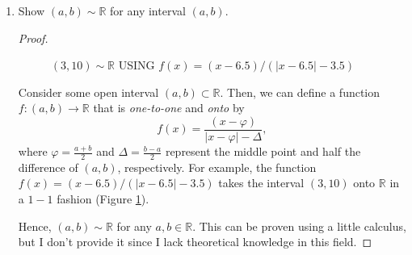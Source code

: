 \documentclass[12pt]{article}
\newcommand{\R}{\mathbb{R}}
\newenvironment{problem}[2][Problem]{\begin{trivlist}
		\item[\hskip \labelsep {\bfseries #1}\hskip \labelsep {\bfseries #2.}]}{\end{trivlist}}
\begin{document}
\begin{problem}{1.5.4}
	\begin{enumerate}[label=(\alph*)]
		\item Show $(a,b) \sim \R$ for any interval $(a,b)$.
		\begin{proof}

		  \begin{figure}
                \centering
                \label{fig:open}
                \caption{$(3,10)\sim \R$ USING $f(x)=(x-6.5)/(\vert x-6.5\vert - 3.5)$}
                \end{figure}

			Consider some open interval $(a,b)\subset \R$. Then, we can define a function $f:(a,b)\to \R$ that is \textit{one-to-one} and \textit{onto} by 
			\begin{equation*}
				f(x) = \frac{(x-\varphi)}{\vert x-\varphi\vert - \Delta},
			\end{equation*}
		where $\varphi = \frac{a+b}{2}$ and $\Delta = \frac{b-a}{2}$ represent the middle point and half the difference of $(a,b)$, respectively. For example, the function $f(x)=(x-6.5)/(\vert x-6.5\vert - 3.5)$ takes the interval $(3,10)$ onto $\R$ in a $1-1$ fashion (Figure \ref{fig:open}).
		

		Hence, $(a,b)\sim \R$ for any $a,b\in \R$. This can be proven using a little calculus, but I don't provide it since I lack theoretical knowledge in this field.
		\end{proof}
	

\end{enumerate}
\end{problem}
\end{document}
